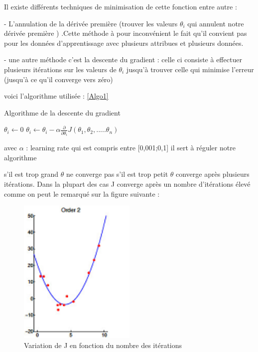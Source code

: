  Il existe différents techniques de minimisation de cette fonction entre autre :
 
  - L'annulation de la dérivée première (trouver les valeurs ${\theta }_{i}$ qui annulent notre dérivée première  ) .Cette méthode à pour inconvénient le fait qu'il convient pas pour les données d'apprentissage avec plusieurs attribues et plusieurs données. 
  
  - une autre méthode c'est la descente du gradient :
  celle ci consiste à effectuer plusieurs itérations sur les valeurs de  ${\theta }_{i}$ jusqu'à trouver celle qui minimise l'erreur (jusqu'à ce qu'il converge vers zéro)
  
  voici l'algorithme utilisée :
\ref{Algo1}
\begin{algorithm}[ht]
	\caption{Algorithme de la descente du gradient }
	\label{Algo1}
	\begin{algorithmic}
		\State ${\theta }_{i} \leftarrow 0$
		\State ${\theta }_{i} \leftarrow  {\theta }_{i} - \alpha \frac{\partial }{\partial {{\theta }_{i}}}J\left({\theta }_{1},{\theta }_{2},.....{\theta }_{n}\right)$
		\EndWhile
	\end{algorithmic}
   \end{algorithm}
  
  avec $\alpha$ : learning rate qui est compris entre [0,001;0,1] il sert à réguler notre algorithme
  
  s'il est trop grand $\theta$ ne converge pas
  s'il est trop petit $\theta$ converge après plusieurs itérations. 
  Dans la plupart des cas J converge après un nombre d'itérations élevé
  comme on peut le remarqué sur la figure suivante :
  \begin{figure}[ht]
  	\centering
  	\includegraphics[width=0.5\textwidth]{fig/regressionPlokynome.png}
  	\caption{Variation de J en fonction du nombre des itérations}
  	\label{fig:image3}
  \end{figure}
   
